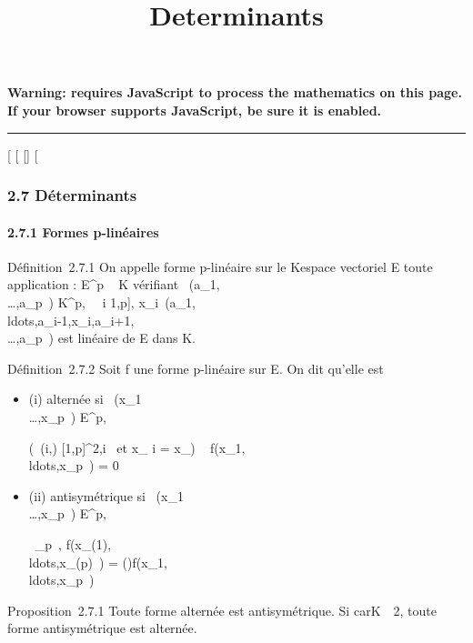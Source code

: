 \documentclass[]{article}
\title{Determinants}
\author{}
\date{}
\begin{document}
\maketitle

\textbf{Warning: 
requires JavaScript to process the mathematics on this page.\\ If your
browser supports JavaScript, be sure it is enabled.}

\begin{center}\rule{3in}{0.4pt}\end{center}

{[}
{[}
{[}{]}
{[}

\subsubsection{2.7 Déterminants}

\paragraph{2.7.1 Formes p-linéaires}

Définition~2.7.1 On appelle forme p-linéaire sur le Kespace vectoriel E
toute application \phi : E^p \rightarrow~ K vérifiant
\forall~(a\_1,\\\ldots,a\_p~)
\in K^p, \forall~~i \in {[}1,p{]},
x\_i\mapsto~\phi(a\_1,\\ldots,a\_i-1,x\_i,a\_i+1,\\\ldots,a\_p~)
est linéaire de E dans K.

Définition~2.7.2 Soit f une forme p-linéaire sur E. On dit qu'elle est

\begin{itemize}
\item
  (i) alternée si
  \forall~(x\_1\\\ldots,x\_p~)
  \in E^p,

  \left (\exists~(i,\jmath) \in
  {[}1,p{]}^2,i\neq~\jmath\text
  et x\_ i = x\_\jmath\right ) \rigtharrow~
  f(x\_1,\\ldots,x\_p~)
  = 0
\item
  (ii) antisymétrique si
  \forall~(x\_1\\\ldots,x\_p~)
  \in E^p,

  \forall~\sigma \inS\_p~,
  f(x\_\sigma(1),\\ldots,x\_\sigma(p)~)
  =
  \epsilon(\sigma)f(x\_1,\\ldots,x\_p~)
\end{itemize}

Proposition~2.7.1 Toute forme alternée est antisymétrique. Si
carK\mathrel\neq~~2, toute forme
antisymétrique est alternée.
\end{document}
